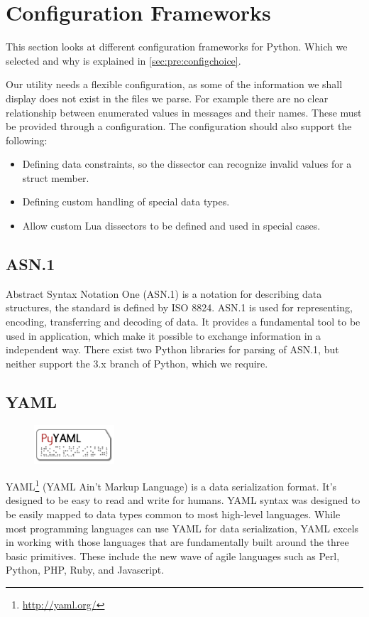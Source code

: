 \section{Configuration Frameworks}
\label{sec:pre:config}
This section looks at different configuration frameworks for Python. Which we
selected and why is explained in \autoref{sec:pre:configchoice}.

Our utility needs a flexible configuration, as some of the information we
shall display does not exist in the files we parse. For example there are no
clear relationship between enumerated values in messages and their names.
These must be provided through a configuration. The configuration should also
support the following:
\begin{itemize}
	\item Defining data constraints, so the dissector can recognize invalid
		values for a struct member.
	\item Defining custom handling of special data types.
	\item Allow custom Lua dissectors to be defined and used in special cases.
\end{itemize}

\subsection{ASN.1}
Abstract Syntax Notation One (ASN.1) is a notation for describing data
structures, the standard is defined by ISO 8824. ASN.1 is used for
representing, encoding, transferring and decoding of data. It provides a
fundamental tool to be used in application, which make it possible to exchange
information in a independent way. There exist two Python libraries for parsing
of  ASN.1, but neither support the 3.x branch of Python, which we require.

\subsection{YAML}
\label{sec:pre:yaml}
\begin{figure}
	\vspace{-30pt}
	\includegraphics[width=3cm]{./planning/img/pyyaml_logo}
	\vspace{-30pt}
\end{figure}
YAML\footnote{\url{http://yaml.org/}} (YAML Ain't Markup Language) is a data
serialization format. It's designed to be easy to read and write for humans.
YAML syntax was designed to be easily mapped to data types common to most
high-level languages. While most programming languages can use YAML for data
serialization, YAML excels in working with those languages that are
fundamentally built around the three basic primitives. These include the new
wave of agile languages such as Perl, Python, PHP, Ruby, and Javascript.


